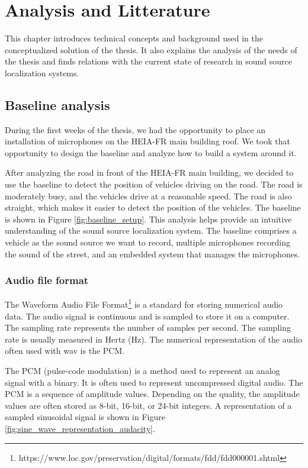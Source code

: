 \chapter{Analysis and Litterature}
\label{ch:background}

This chapter introduces technical concepts and background used in the conceptualized solution of the thesis. It also explains the analysis of the needs of the thesis and finds relations with the current state of research in sound source localization systems.

\section{Baseline analysis}
\label{sec:baseline_analysis}

During the first weeks of the thesis, we had the opportunity to place an installation of microphones on the HEIA-FR main building roof. We took that opportunity to design the baseline and analyze how to build a system around it.

After analyzing the road in front of the HEIA-FR main building, we decided to use the baseline to detect the position of vehicles driving on the road. The road is moderately busy, and the vehicles drive at a reasonable speed. The road is also straight, which makes it easier to detect the position of the vehicles. The baseline is shown in Figure \ref{fig:baseline_setup}. This analysis helps provide an intuitive understanding of the sound source localization system. The baseline comprises a vehicle as the sound source we want to record, multiple microphones recording the sound of the street, and an embedded system that manages the microphones.

\subsection{Audio file format}
\label{subsec:audio_file_format}

The Waveform Audio File Format\footnote{https://www.loc.gov/preservation/digital/formats/fdd/fdd000001.shtml} is a standard for storing numerical audio data. The audio signal is continuous and is sampled to store it on a computer. The sampling rate represents the number of samples per second. The sampling rate is usually measured in Hertz (Hz). The numerical representation of the audio often used with wav is the PCM.

The PCM (pulse-code modulation)\cite{5059525} is a method used to represent an analog signal with a binary. It is often used to represent uncompressed digital audio. The PCM is a sequence of amplitude values. Depending on the quality, the amplitude values are often stored as 8-bit, 16-bit, or 24-bit integers. A representation of a sampled sinusoidal signal is shown in Figure \ref{fig:sine_wave_representation_audacity}.

